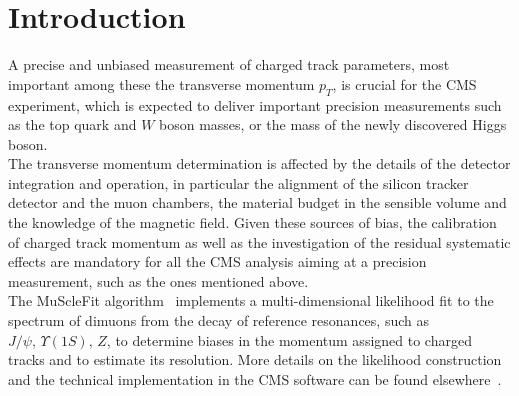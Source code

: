\section{Introduction}
A precise and unbiased measurement of charged track parameters, most important among these
the transverse momentum $p_{T}$, is crucial for the CMS experiment, which is expected to deliver
important precision measurements such as the top quark and $W$ boson masses, or the mass of
the newly discovered Higgs boson. \\
The transverse momentum determination is affected by the details of the detector integration and
operation, in particular the alignment of the silicon tracker detector and the muon chambers, 
the material budget in the sensible volume and the knowledge of the magnetic field. 
Given these sources of bias, the calibration of charged track momentum as well as the
investigation of the residual systematic effects are mandatory for all the CMS analysis aiming
at a precision measurement, such as the ones mentioned above.\\
The MuScleFit algorithm~\cite{CMS_AN_2010-059} implements a multi-dimensional likelihood fit to 
the spectrum of dimuons from the decay of
reference resonances, such as $J/\psi,\, \Upsilon(1S),\, Z$, to determine biases in the momentum assigned to
charged tracks and to estimate its resolution. More details on the likelihood construction and 
the technical implementation in the CMS software can be found elsewhere~\cite{CMS_AN_2010-059}.\\
